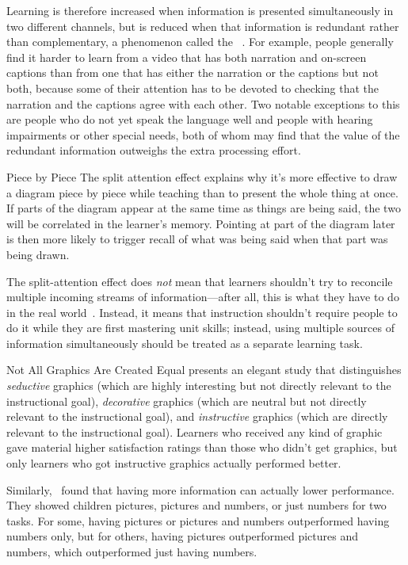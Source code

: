 Learning is therefore increased when information is presented simultaneously in two different channels,
but is reduced when that information is redundant rather than complementary,
a phenomenon called the ~\cite{Maye2003}.
For example,
people generally find it harder to learn from a video that has both narration and on-screen captions
than from one that has either the narration or the captions but not both,
because some of their attention has to be devoted to checking
that the narration and the captions agree with each other.
Two notable exceptions to this are people who do not yet speak the language well
and people with hearing impairments or other special needs,
both of whom may find that the value of the redundant information
outweighs the extra processing effort.

\begin{aside}{Piece by Piece}
  The split attention effect explains why
  it's more effective to draw a diagram piece by piece while teaching
  than to present the whole thing at once.
  If parts of the diagram appear at the same time as things are being said,
  the two will be correlated in the learner's memory.
  Pointing at part of the diagram later
  is then more likely to trigger recall of what was being said when that part was being drawn.
\end{aside}

The split-attention effect does \emph{not} mean
that learners shouldn't try to reconcile multiple incoming streams of information---after all,
this is what they have to do in the real world~\cite{Atki2000}.
Instead,
it means that instruction shouldn't require people to do it
while they are first mastering unit skills;
instead,
using multiple sources of information simultaneously should be treated as a separate learning task.

\begin{aside}{Not All Graphics Are Created Equal}
  \cite{Sung2012} presents an elegant study that distinguishes \emph{seductive} graphics
  (which are highly interesting but not directly relevant to the instructional goal),
  \emph{decorative} graphics
  (which are neutral but not directly relevant to the instructional goal),
  and \emph{instructive} graphics
  (which are directly relevant to the instructional goal).
  Learners who received any kind of graphic gave material higher satisfaction ratings
  than those who didn't get graphics,
  but only learners who got instructive graphics actually performed better.

  Similarly,~\cite{Stam2013,Stam2014} found that
  having more information can actually lower performance.
  They showed children pictures, pictures and numbers, or just numbers for two tasks.
  For some,
  having pictures or pictures and numbers outperformed having numbers only,
  but for others,
  having pictures outperformed pictures and numbers,
  which outperformed just having numbers.
\end{aside}

